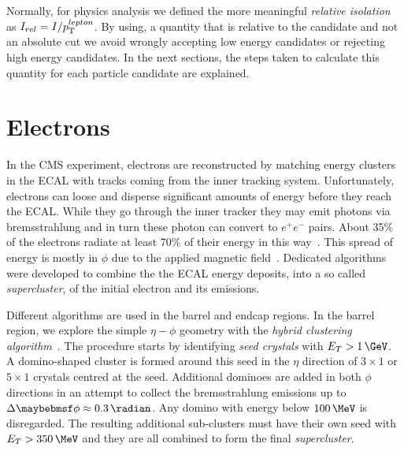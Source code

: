 Normally, for physics analysis we defined the more meaningful \textit{relative isolation} as $I_{rel} = I/p_{\mathrm{T}}^{lepton}$. By using, a quantity that is relative to the candidate \pt and not an absolute cut we avoid wrongly accepting low energy candidates or rejecting high energy candidates. In the next sections, the steps taken to calculate this quantity for each particle candidate are explained.

\section{Electrons}
\label{SECTION:EventReconstructionAndSimulation_Electrons}


In the \gls{CMS} experiment, electrons are reconstructed by matching energy clusters in the \gls{ECAL} with tracks coming from the inner tracking system. Unfortunately, electrons can loose and disperse significant amounts of energy before they reach the \gls{ECAL}. While they go through the inner tracker they may emit photons via bremsstrahlung and in turn these photon can convert to $e^+e^-$ pairs. About 35\% of the electrons radiate at least 70\% of their energy in this way~\cite{ARTICLE:CMSElectronReconstruction}. This spread of energy is mostly in $\phi$ due to the applied magnetic field~\cite{ARTICLE:CMSElectronReconstructionECAL}. Dedicated algorithms were developed to combine the the \gls{ECAL} energy deposits, into a so called \textit{supercluster}, of the initial electron and its emissions.

Different algorithms are used in the barrel and endcap regions. In the barrel region, we explore the simple $\eta-\phi$ geometry with the \textit{hybrid clustering algorithm}~\cite{ARTICLE:CMSElectronReconstruction8TeV}. The procedure starts by identifying \textit{seed crystals} with $E_T>1\,\GeV$. A domino-shaped cluster is formed around this seed in the $\eta$ direction of $3 \times 1$ or $5 \times 1$ crystals centred at the seed. Additional dominoes are added in both $\phi$ directions in an attempt to collect the bremsstrahlung emissions up to $\Delta\phi \approx 0.3\,\radian$. Any domino with energy below $100\,\MeV$ is disregarded. The resulting additional sub-clusters must have their own seed with $E_T>350\,\MeV$ and they are all combined to form the final \textit{supercluster}. 


